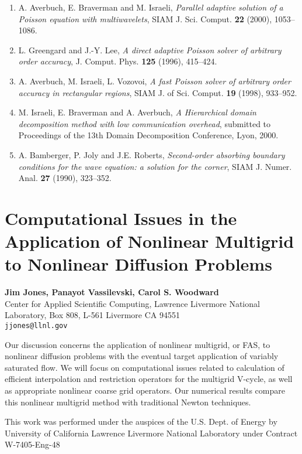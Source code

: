 \documentclass[11pt]{article}
\newcommand{\nextab}[4]{
	\section{#2}
	{\bf #1} \\ \nopagebreak
	{#3} \\ \nopagebreak
	{\tt #4} \nopagebreak
	}
\begin{document}
\begin{enumerate}

\item
A. Averbuch, E. Braverman and M. Israeli,
{\em Parallel adaptive solution of
a Poisson equation with multiwavelets},
SIAM J. Sci. Comput. {\bf 22} (2000), 1053--1086.

\item
L. Greengard and J.-Y. Lee,
{\em A direct adaptive Poisson solver of arbitrary order
accuracy}, J. Comput. Phys. {\bf 125} (1996), 415--424.

\item
A. Averbuch, M. Israeli, L. Vozovoi,
{\em A fast Poisson solver of arbitrary order accuracy
in rectangular regions},
SIAM J. of Sci. Comput.
{\bf 19} (1998), 933--952.

\item
M. Israeli, E. Braverman and A. Averbuch,
{\em A Hierarchical domain decomposition method with
low communication overhead}, submitted to Proceedings of
the 13th Domain Decomposition Conference, Lyon, 2000.

\item
A. Bamberger, P. Joly and J.E. Roberts,
{\em Second-order absorbing boundary conditions for the wave
equation: a solution for the corner},
SIAM J. Numer. Anal. {\bf 27} (1990), 323--352.

\end{enumerate}


\nextab
{Jim Jones, Panayot Vassilevski, Carol S. Woodward}
{Computational Issues in the Application of Nonlinear Multigrid to Nonlinear Diffusion Problems}
{Center for Applied Scientific Computing, Lawrence Livermore National Laboratory, Box 808, L-561 Livermore CA 94551}
{jjones@llnl.gov}



Our discussion concerns the application of nonlinear multigrid,
or FAS, to nonlinear diffusion problems with the eventual target
application of variably saturated flow.  We will focus on
computational issues related to calculation of efficient
interpolation and restriction operators for the multigrid
V-cycle, as well as appropriate nonlinear coarse grid operators.
Our numerical results compare this nonlinear multigrid method
with traditional Newton techniques.

This work was performed under the auspices of the U.S. Dept. of
Energy by University of California
Lawrence Livermore National Laboratory under
Contract W-7405-Eng-48
\end{document}
